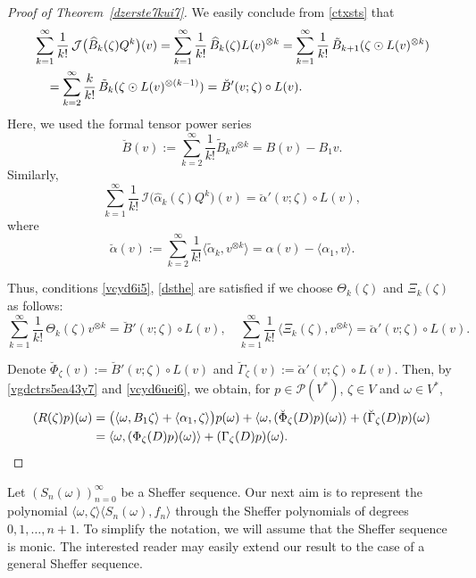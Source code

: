\documentclass[12pt]{article}
\theoremstyle{remark}
\theoremstyle{remark}
\theoremstyle{remark}
\begin{document}
\begin{proof}[Proof of Theorem~\ref{dzerste7kui7}]
We easily conclude from \eqref{ctxsts} that 
\begin{align}
&\sum_{k=1}^\infty \frac 1{k!}\,\mathcal J\big(\widehat B_{k}(\zeta) Q^{k}\big)(v)=
\sum_{k=1}^\infty \frac 1{k!}\,\widehat B_{k}(\zeta) L(v)^{\otimes k}
=\sum_{k=1}^\infty \frac 1{k!}\,\tilde B_{k+1}(\zeta\odot L(v)^{\otimes k})\notag\\
&\quad= \sum_{k=2}^\infty\frac{k}{k!}\,\tilde B_k(\zeta\odot L(v)^{\otimes(k-1)})=\breve B'(v;\zeta)\circ L(v). \label{vftr6e645}
\end{align}
Here, we used the formal tensor power series 
$$\breve B(v):=\sum_{k=2}^\infty \frac1{k!}\tilde B_kv^{\otimes k}=B(v)-B_1v.$$ 
Similarly,
\begin{equation}
\sum_{k=1}^\infty \frac 1{k!}\,\mathcal I\big(\widehat \alpha_{k}(\zeta) Q^{k}\big)(v)=\breve \alpha'(v;\zeta)\circ L(v),
\label{ryd6ue5i7}
\end{equation}
where 
$$\breve \alpha (v):=\sum_{k=2}^\infty \frac1{k!}\langle \tilde \alpha _k,v^{\otimes k}\rangle=\alpha(v)-\langle \alpha_1,v\rangle.$$ 

Thus, conditions \eqref{vcyd6i5}, \eqref{dsthe} are satisfied if we choose $\Theta_k(\zeta)$ and $\Xi_k(\zeta)$ as follows:
\begin{equation}\label{vcyd6uei6}
\sum_{k=1}^\infty \frac 1{k!}\,  \Theta_k(\zeta) v^{\otimes k}=\breve B'(v;\zeta)\circ L(v),\quad \sum_{k=1}^\infty \frac 1{k!}\,  \langle \Xi_k(\zeta), v^{\otimes k}\rangle=\breve\alpha'(v;\zeta)\circ L(v).\end{equation}

 Denote $\breve\Phi_\zeta(v):=\breve B'(v;\zeta)\circ L(v)$ and $\breve\Gamma_\zeta(v):=\breve \alpha'(v;\zeta)\circ L(v)$. Then, by \eqref{vgdctrs5ea43y7} and \eqref{vcyd6uei6}, we obtain, for 
 $p\in\mathcal P(V^*)$, $\zeta\in V$ and $\omega\in V^*$,
\begin{align*}
(R(\zeta)p)(\omega)&=\big(\langle\omega, B_1\zeta\rangle
+\langle\alpha_1,\zeta\rangle\big)p(\omega)+\langle\omega,(\breve\Phi_\zeta(D)p)(\omega)\rangle+(\breve\Gamma_\zeta(D)p)(\omega)\\
&=\langle\omega,(\Phi_\zeta(D)p)(\omega)\rangle+(\Gamma_\zeta(D)p)(\omega).\qedhere
\end{align*}
\end{proof}

  
 
 Let $(S_n(\omega))_{n=0}^\infty$ be a Sheffer sequence.  Our next aim is to represent the polynomial $\langle\omega,\zeta\rangle \langle S_n(\omega),f_n\rangle$ through the Sheffer polynomials of degrees $0,1,\dots,n+1$.  
To simplify the notation, we will assume that the Sheffer sequence is monic. The interested reader may easily extend our result to the case of a general Sheffer sequence.  
 
\end{document}
